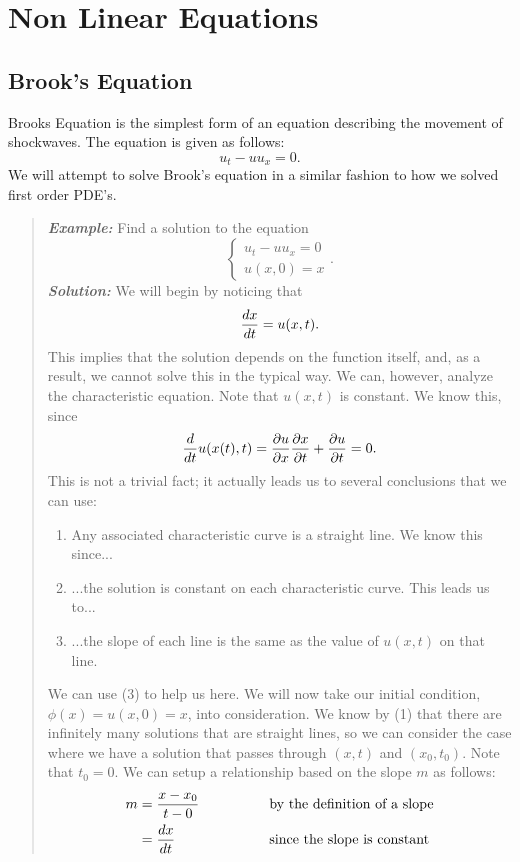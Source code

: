 \section{Non Linear Equations}
\subsection{Brook's Equation}

Brooks Equation is the simplest form of an equation describing the movement of shockwaves. The equation
is given as follows:
\[
u_{t} - uu_{x} = 0.
\]
We will attempt to solve Brook's equation in a similar fashion to how we solved first order PDE's.
\begin{quote}
\textit{\textbf{Example:}} Find a solution to the equation
\[
\begin{cases}
u_{t} - uu_{x} = 0\\
u(x,0) = x
\end{cases}.
\]
\textit{\textbf{Solution:}} We will begin by noticing that
\[
{dx\over dt} = u(x,t).
\]
This implies that the solution depends on the function itself, and, as a result, we cannot solve this in
the typical way. We can, however, analyze the characteristic equation. Note that $u(x,t)$ is constant. We
know this, since
\[
{d\over dt}u(x(t),t)=
{\partial u\over\partial x}{\partial x \over \partial t} + {\partial u\over \partial t}=
0.
\]
This is not a trivial fact; it actually leads us to several conclusions that we can use:
\begin{enumerate}
\item Any associated characteristic curve is a straight line. We know this since...
\item ...the solution is constant on each characteristic curve. This leads us to...
\item ...the slope of each line is the same as the value of $u(x,t)$ on that line.
\end{enumerate}
We can use (3) to help us here. We will now take our initial condition, $\phi(x)=u(x,0)=x$, into
consideration. We know by (1) that there are infinitely many solutions that are straight lines, so
we can consider the case where we have a solution that passes through $(x,t)$ and $(x_{0},t_{0})$. Note
that $t_{0} = 0$. We can setup a relationship based on the slope $m$ as follows:
\begin{alignat*}{3}
m &= {x-x_{0}\over t-0}\qquad\qquad &&\text{by the definition of a slope}\\
&= {dx\over dt} &&\text{since the slope is constant}\\

\end{alignat*}
\end{quote}
